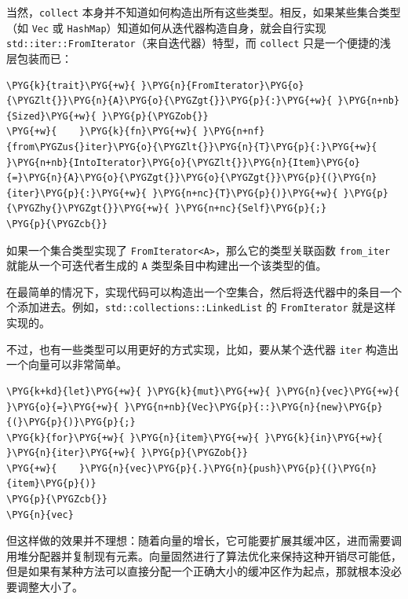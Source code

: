 当然，\texttt{collect} 本身并不知道如何构造出所有这些类型。相反，如果某些集合类型（如 \texttt{Vec} 或 \texttt{HashMap}）知道如何从迭代器构造自身，就会自行实现 \texttt{std::iter::FromIterator}（来自迭代器）特型，而 \texttt{collect} 只是一个便捷的浅层包装而已：

\begin{Verbatim}[commandchars=\\\{\},breaklines=true,breakanywhere=true,fontsize=\codefont,xleftmargin=17bp]
\PYG{k}{trait}\PYG{+w}{ }\PYG{n}{FromIterator}\PYG{o}{\PYGZlt{}}\PYG{n}{A}\PYG{o}{\PYGZgt{}}\PYG{p}{:}\PYG{+w}{ }\PYG{n+nb}{Sized}\PYG{+w}{ }\PYG{p}{\PYGZob{}}
\PYG{+w}{    }\PYG{k}{fn}\PYG{+w}{ }\PYG{n+nf}{from\PYGZus{}iter}\PYG{o}{\PYGZlt{}}\PYG{n}{T}\PYG{p}{:}\PYG{+w}{ }\PYG{n+nb}{IntoIterator}\PYG{o}{\PYGZlt{}}\PYG{n}{Item}\PYG{o}{=}\PYG{n}{A}\PYG{o}{\PYGZgt{}}\PYG{o}{\PYGZgt{}}\PYG{p}{(}\PYG{n}{iter}\PYG{p}{:}\PYG{+w}{ }\PYG{n+nc}{T}\PYG{p}{)}\PYG{+w}{ }\PYG{p}{\PYGZhy{}\PYGZgt{}}\PYG{+w}{ }\PYG{n+nc}{Self}\PYG{p}{;}
\PYG{p}{\PYGZcb{}}
\end{Verbatim}

如果一个集合类型实现了 \texttt{FromIterator<A>}，那么它的类型关联函数 \texttt{from\_iter} 就能从一个可迭代者生成的 \texttt{A} 类型条目中构建出一个该类型的值。

在最简单的情况下，实现代码可以构造出一个空集合，然后将迭代器中的条目一个个添加进去。例如，\texttt{std::collections::LinkedList} 的 \texttt{FromIterator} 就是这样实现的。

不过，也有一些类型可以用更好的方式实现，比如，要从某个迭代器 \texttt{iter} 构造出一个向量可以非常简单。

\begin{Verbatim}[commandchars=\\\{\},breaklines=true,breakanywhere=true,fontsize=\codefont,xleftmargin=17bp]
\PYG{k+kd}{let}\PYG{+w}{ }\PYG{k}{mut}\PYG{+w}{ }\PYG{n}{vec}\PYG{+w}{ }\PYG{o}{=}\PYG{+w}{ }\PYG{n+nb}{Vec}\PYG{p}{::}\PYG{n}{new}\PYG{p}{(}\PYG{p}{)}\PYG{p}{;}
\PYG{k}{for}\PYG{+w}{ }\PYG{n}{item}\PYG{+w}{ }\PYG{k}{in}\PYG{+w}{ }\PYG{n}{iter}\PYG{+w}{ }\PYG{p}{\PYGZob{}}
\PYG{+w}{    }\PYG{n}{vec}\PYG{p}{.}\PYG{n}{push}\PYG{p}{(}\PYG{n}{item}\PYG{p}{)}
\PYG{p}{\PYGZcb{}}
\PYG{n}{vec}
\end{Verbatim}

但这样做的效果并不理想：随着向量的增长，它可能要扩展其缓冲区，进而需要调用堆分配器并复制现有元素。向量固然进行了算法优化来保持这种开销尽可能低，但是如果有某种方法可以直接分配一个正确大小的缓冲区作为起点，那就根本没必要调整大小了。

